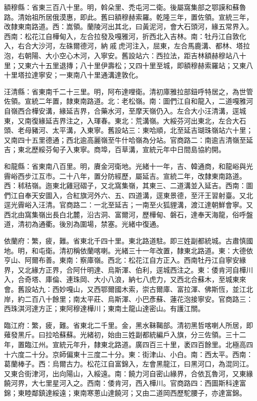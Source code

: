 \begin{pinyinscope}
額穆縣：省東三百八十里。明，斡朵里、禿屯河二衛。後屬窩集部之鄂謨和蘇魯路。清始祖所居俄漠惠，即此。舊曰額穆赫索羅。乾隆三年，置佐領。宣統三年，改隸東南路道。西：嵩領。蘭陵河出其北，曰黃泥河，會大石頭河，緣五常界入。西南：松花江自樺甸入，左合拉發及嘎雅河，折西北入吉林。南：牡丹江自敦化入，右合大沙河，左硃爾德河，納戚虎河注入，屈東，左合馬鹿溝、都林、塔拉泡，右朝陽、大小空心木河，入寧安。舊設站六：西拉法，距吉林額赫穆站八十里；又東六十五里退摶；八十里伊壽松；又四十里至城，即額穆赫索羅站；又東八十里塔拉達寧安；一東南八十里通溝達敦化。

汪清縣：省東南千二十三里。明，阿布達哩衛。清初庫雅拉部鈕呼特居之，為世管佐領。宣統二年置，隸東南路道。北：老松嶺。南：圖們江自和龍入，二道嘎雅河自嶺西合樺安溝，緣延吉界，合藥水河，至摩天嶺仍入。左合大小汪清溝，逕城東，又南復緣延吉界注之，入琿春。東北：荒溝嶺。大綏芬河出東北，左合大石頭、老母豬河、太平溝，入東寧。舊設站三：東哈順，北至延吉瑚珠嶺站六十里；又南四十五里德通；西北逾高麗嶺至牛什哈嶺為分站。官商路二：南逾吉清嶺至延吉；東北歷綏芬甸子入東寧。商埠，百草溝，宣統元年中日間島協約開。

和龍縣：省東南八百里。明，賡金河衛地。光緒十一年，吉、韓通商，和龍峪與光霽峪西步江互市。二十八年，置分防經歷，屬延吉。宣統二年，改隸東南路道。西：秫秸嶺。迤東北雞冠磖子，又北窩集嶺，其東三、二道溝並入延吉。西南：圖們江自奉天安圖入，合紅旗河外六、五、四道溝，逕東景德，至汗王習射臺。又北逕光霽峪入汪清。官商路二：一北至延吉；一南至火狐貍溝，渡江達朝鮮會寧。又西北由窩集嶺出長白北麓，沿古洞、富爾河，歷樺甸、磐石，達奉天海龍，俗呼盤道，清初為通衢。後別為圍場，禁塞。光緒中復通。

依蘭府：繁，疲，難。省東北千四十里。東北路道駐。即三姓副都統城。古肅慎國地。明，和屯衛。清初稱依蘭喀喇。光緒三十一年改置，隸東北路道。東：大德依亨山、阿爾布善。東南：察庫嶺。西北：松花江自方正入。西南牡丹江自寧安緣界，又北緣方正界，合阿什明達、烏斯渾、伯利，逕城西注之。東：倭肯河自樺川入，合奇塔、庫倫、連珠岡、大小八浪，納七八虎力，又西北合蘇木，至城東來會。舊設站九：西妙嘎山，又西鄂爾國木索，崇古爾庫、富拉渾、佛斯恆，並江北岸，約二百八十餘里；南太平莊、烏斯渾、小巴彥蘇、蓮花泡接寧安。官商路三：西珠淇河達方正；東阿穆達樺川；東南土龍山達密山。有護江關。

臨江府：繁，疲，難。省東北二千里。金，黑水靺鞨部。清初黑哲喀喇人所居，即薙發黑斤。曰拉哈蘇蘇。光緒初，始由三姓副都統編戶入旗，分三佐領。三十二年，置臨江州。宣統元年升，隸東北路道。廣四百三十里，袤四百餘里。北極高四十六度二十分。京師偏東十三度二十分。東：街津山、小白。南：西太平。西南：葛蘭棒子。西：烏爾古力。松花江自富錦入，左會黑龍江，曰黑河口，為混同江。又東合街津河，出向陽山，入綏遠。南：饒力河自密山緣界，合依瓦魯河，又東緣饒河界，大七里星河入之。西南：倭肯河，西入樺川。官商路四：西圖斯科達富錦；東睦鄰鎮達綏遠；東南寒蔥山達饒河；又由二道岡西歷駝腰子，亦達富錦。


\end{pinyinscope}
